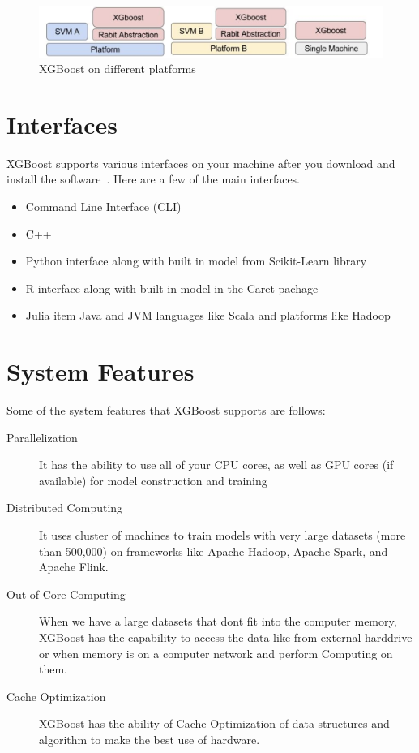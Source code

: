 \begin{figure}[!ht]
        \centering\includegraphics[width=\columnwidth]
        {images/XGBoost-on-different-platforms.png}
        \caption{XGBoost on different platforms}\label{fig:XGBoost-on-different-platforms}
\end{figure}

\section{Interfaces}

XGBoost supports various interfaces on your machine after you download and
install the software~\cite{hid-sp18-401-XGBoost-MLmastery}. Here are a few 
of the main interfaces.

\begin{itemize}
\item Command Line Interface (CLI)  
\item C++  
\item Python interface along with built in model from Scikit-Learn library   
\item R interface along with built in model in the Caret pachage  
\item Julia item Java and JVM languages like Scala and platforms like Hadoop
\end{itemize}



\section{System Features} 

Some of the system features that XGBoost supports are follows: 

\begin{description}
\item[Parallelization]

It has the ability to use all of your CPU cores, as well as GPU cores (if
available) for model construction and training

\item[Distributed Computing]

It uses cluster of machines to train models with very large datasets (more than
500,000) on frameworks like Apache Hadoop, Apache Spark, and Apache Flink.

\item[Out of Core Computing]

When we have a large datasets that dont fit into the computer memory, XGBoost
has the capability to access the data  like from external harddrive or when
memory is on a computer network and perform Computing on them.

\item[Cache Optimization]

XGBoost has the ability of Cache Optimization of data structures and algorithm
to make the best use of hardware.

\end{description}



